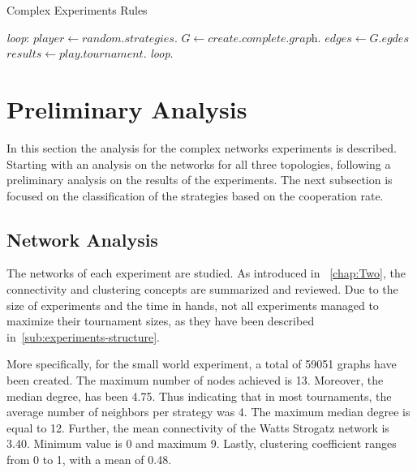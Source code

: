 \begin{algorithm}
	\caption{Complex Experiments Rules}\label{complete-experiment}
	\begin{algorithmic}
		\BState \emph{loop}:
		\State $player \gets \textit{random.strategies}$.
		\State $G \gets \textit{create.complete.graph}$.
		\State $edges \gets \textit{G.egdes}$
		\State $results \gets \textit{play.tournament}$.
		\emph{loop}.
		\EndFor
		\EndFor
		\EndProcedure
	\end{algorithmic}
\end{algorithm}

\section{Preliminary Analysis}
In this section the analysis for the complex networks experiments is described.
Starting with an analysis on the networks for all three topologies, following
a preliminary analysis on the results of the experiments. The next subsection is
focused on the classification of the strategies based on the cooperation rate.

\subsection{Network Analysis}
\label{sub:network-analysis}
The networks of each experiment are studied. As introduced in ~\ref{chap:Two}, the
connectivity and clustering concepts are summarized and reviewed. Due to the
size of experiments and the time in hands, not all experiments managed to
maximize their tournament sizes, as they have been described in~\ref{sub:experiments-structure}.

More specifically, for the small world experiment, a total of 59051 graphs have
been created. The maximum number of nodes achieved is 13. Moreover, the
median degree, has been 4.75. Thus indicating that
in most tournaments, the average number of neighbors per strategy was 4.
The maximum median degree is equal to 12. Further, the mean connectivity of the
Watts Strogatz network is 3.40. Minimum value is 0 and maximum 9. Lastly,
clustering coefficient ranges from 0 to 1, with a mean of 0.48.


